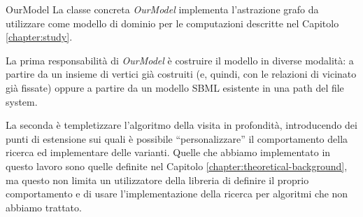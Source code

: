 \begin{paragraph}{OurModel}
  La classe concreta \emph{OurModel} implementa l'astrazione grafo da
  utilizzare come modello di dominio per le computazioni descritte nel
  Capitolo \ref{chapter:study}.

  La prima responsabilit\`a di \emph{OurModel} \`e costruire il
  modello in diverse modalit\`a: a partire da un insieme di vertici
  gi\`a costruiti (e, quindi, con le relazioni di vicinato gi\`a
  fissate) oppure a partire da un modello SBML esistente in una path
  del file system.

  La seconda \`e templetizzare l'algoritmo della visita in
  profondit\`a, introducendo dei punti di estensione sui quali \`e
  possibile ``personalizzare'' il comportamento della ricerca ed
  implementare delle varianti. Quelle che abbiamo implementato in
  questo lavoro sono quelle definite nel Capitolo
  \ref{chapter:theoretical-background}, ma questo non limita un
  utilizzatore della libreria di definire il proprio comportamento e
  di usare l'implementazione della ricerca per algoritmi che non
  abbiamo trattato.

\end{paragraph}

